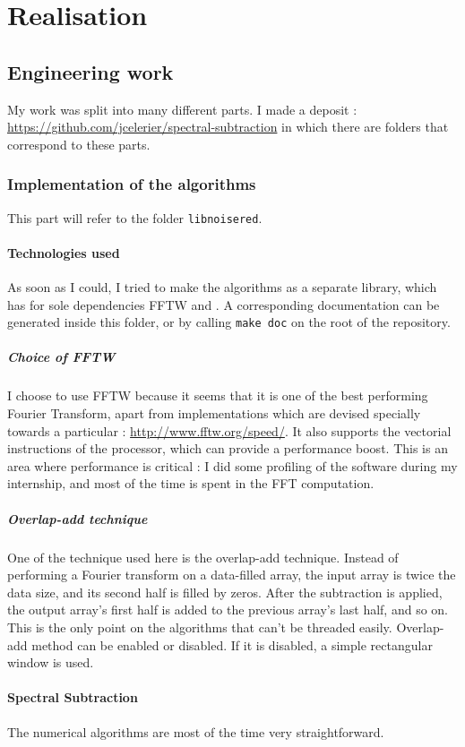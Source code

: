 \section{Realisation}
\subsection{Engineering work}
My work was split into many different parts. I made a  deposit : \url{https://github.com/jcelerier/spectral-subtraction} in which there are folders that correspond to these parts.
\subsubsection{Implementation of the algorithms}
This part will refer to the folder \texttt{libnoisered}. 

\paragraph{Technologies used}
As soon as I could, I tried to make the algorithms as a separate library, which has for sole dependencies \ac{FFTW} and . A corresponding  documentation can be generated inside this folder, or by calling \texttt{make doc} on the root of the repository.

\subparagraph{Choice of \ac{FFTW}} I choose to use \ac{FFTW} because it seems that it is one of the best performing Fourier Transform, apart from implementations which are devised specially towards a particular : \url{http://www.fftw.org/speed/}.
It also supports the  vectorial instructions of the  processor, which can provide a performance boost.
This is an area where performance is critical : I did some profiling of the software during my internship, and most of the time is spent in the \ac{FFT} computation.
\subparagraph{Overlap-add technique}
One of the technique used here is the overlap-add technique. Instead of performing a Fourier transform on a data-filled array, the input array is twice the data size, and its second half is filled by zeros.
After the subtraction is applied, the output array's first half is added to the previous array's last half, and so on. This is the only point on the algorithms that can't be threaded easily.
Overlap-add method can be enabled or disabled. If it is disabled, a simple rectangular window is used.
\paragraph{Spectral Subtraction}
The numerical algorithms are most of the time very straightforward.

